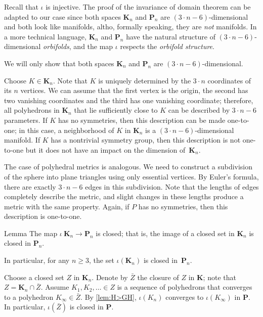 Recall that $\iota$ is injective.
The proof of the invariance of domain theorem can be adapted to our case since both spaces $\mathbf{K}_n$ and $\mathbf{P}_n$ are $(3\cdot n-6)$-dimensional and both look like manifolds, altho, formally speaking, they are \textit{not} manifolds.
In a more technical language, $\mathbf{K}_n$ and $\mathbf{P}_n$ have the natural structure of $(3\cdot n-6)$-dimensional \textit{orbifolds},
and the map $\iota$ respects the \textit{orbifold structure}.

We will only show that both spaces $\mathbf{K}_n$ and $\mathbf{P}_n$ are $(3\cdot n-6)$-dimensional.

Choose  $K\in\mathbf{K}_n$.
Note that $K$ is uniquely determined by the $3\cdot n$ coordinates of its $n$ vertices.
We can assume that the first vertex is the origin, the second has two vanishing coordinates and the third has one vanishing coordinate; therefore, all polyhedrons in $\mathbf{K}_n$ that lie sufficiently close to $K$ can be described by $3\cdot n-6$ parameters.
If $K$ has no symmetries, then this description can be made one-to-one;
in this case, a neighborhood of $K$ in $\mathbf{K}_n$ is a $(3\cdot n-6)$-dimensional manifold.
If $K$ has a nontrivial symmetry group, then this description is not one-to-one but it does not have an impact on the dimension of~$\mathbf{K}_n$.

The case of polyhedral metrics is analogous.
We need to construct a subdivision of the sphere into plane triangles using only essential vertices.
By Euler's formula, there are exactly $3\cdot n-6$ edges in this subdivision.
Note that the lengths of edges completely describe the metric, and slight changes in these lengths produce a metric with the same property.
Again, if $P$ has no symmetries, then this description is one-to-one.

\begin{thm}{Lemma}
The map $\iota\:\mathbf{K}_n\to\mathbf{P}_n$ is closed;
that is, the image of a closed set in $\mathbf{K}_n$ is closed in $\mathbf{P}_n$.

In particular, for any $n\ge 3$, the set $\iota(\mathbf{K}_n)$ is closed in~$\mathbf{P}_n$.
\end{thm}

Choose a closed set $Z$ in $\mathbf{K}_n$.
Denote by $\bar Z$ the closure of $Z$ in $\mathbf{K}$; note that $Z=\mathbf{K}_n\cap \bar Z$.
Assume $K_1,K_2,\dots\in Z$ is a sequence of polyhedrons that converges to a polyhedron $K_\infty\in\bar Z$.
By \ref{lem:H>GH}, $\iota(K_n)$ converges to $\iota(K_\infty)$ in $\mathbf{P}$.
In particular, $\iota(\bar Z)$ is closed in $\mathbf{P}$.


